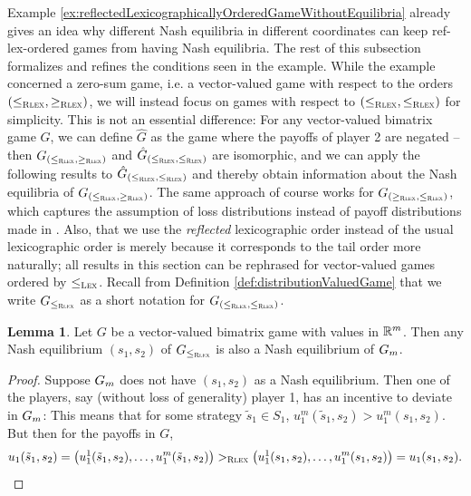 \documentclass[a4paper]{scrreprt}
\theoremstyle{definition}
\newtheorem{lemma}[thm]{Lemma} %
\begin{document}
    Example \ref{ex:reflectedLexicographicallyOrderedGameWithoutEquilibria} already gives an idea why different Nash equilibria in different coordinates can keep ref-lex-ordered games from having Nash equilibria. The rest of this subsection formalizes and refines the conditions seen in the example.
    While the example concerned a zero-sum game, i.e. a vector-valued game with respect to the orders ${(\leq_{\textsc{Rlex}},\geq_{\textsc{Rlex}})}$, we will instead focus on games with respect to ${(\leq_{\textsc{Rlex}},\leq_{\textsc{Rlex}})}$ for simplicity. This is not an essential difference: 
    For any vector-valued bimatrix game $G$, we can define $\hat{G}$ as the game where the payoffs of player 2 are negated -- then $G_{{(\leq_{\textsc{Rlex}},\geq_{\textsc{Rlex}})}}$ and $\hat{G}_{{(\leq_{\textsc{Rlex}},\leq_{\textsc{Rlex}})}}$ are isomorphic, and we can apply the following results to $\hat{G}_{{(\leq_{\textsc{Rlex}},\leq_{\textsc{Rlex}})}}$ and thereby obtain information about the Nash equilibria of $G_{{(\leq_{\textsc{Rlex}},\geq_{\textsc{Rlex}})}}$.
    The same approach of course works for $G_{{(\geq_{\textsc{Rlex}},\leq_{\textsc{Rlex}})}}$, which captures the assumption of loss distributions instead of payoff distributions made in \cite{bib:rassGameRiskManagI}. 
    Also, that we use the \emph{reflected} lexicographic order instead of the usual lexicographic order is merely because it corresponds to the tail order more naturally; all results in this section can be rephrased for vector-valued games ordered by $\leq_{\textsc{Lex}}$.
    Recall from Definition \ref{def:distributionValuedGame} that we write $G_{\leq_{\textsc{Rlex}}}$ as a short notation for $G_{(\leq_{\textsc{Rlex}}, \leq_{\textsc{Rlex}})}$.
    
    \begin{lemma}
        \label{lem:GmHasAllNashEquilibriaOfG}
        Let $G$ be a vector-valued bimatrix game with values in $\mathbb{R}^m$.
        Then any Nash equilibrium $(s_1, s_2)$ of $G_{\leq_{\textsc{Rlex}}}$ is also a Nash equilibrium of $G_{m}$.
    \end{lemma}
    \begin{proof}
        Suppose $G_{m}$ does not have $(s_1, s_2)$ as a Nash equilibrium.
        Then one of the players, say (without loss of generality) player 1, has an incentive to deviate in $G_{m}$:
        This means that for some strategy $\tilde{s}_1 \in S_1$, $u_1^{m}(\tilde{s}_1, s_2) > u_1^{m}(s_1, s_2)$.
        But then for the payoffs in $G$, 
        \begin{gather*}
            u_1(\tilde{s}_1, s_2) = \bigl(u_1^{1}(\tilde{s}_1, s_2), \dots, u_1^{m}(\tilde{s}_1, s_2)\bigr)
            >_{\textsc{Rlex}} \bigl(u_1^{1}(s_1, s_2), \dots, u_1^{m}(s_1, s_2)\bigr) = u_1(s_1, s_2).
        \end{gather*}
    \end{proof}
\end{document}
